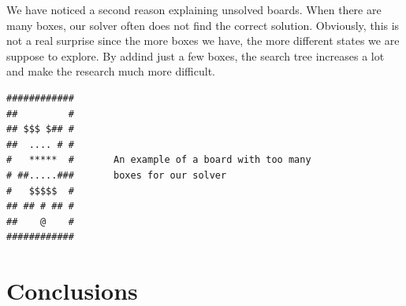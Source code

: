 \documentclass[a4paper,10pt]{article}
\begin{document}
We have noticed a second reason explaining unsolved boards. When there are many boxes, our solver often does not find the correct solution. Obviously, this is not a real surprise since the more boxes we have, the more different states we are suppose to explore. By addind just a few boxes, the search tree increases a lot and make the research much more difficult.

\begin{verbatim}
############
##         #
## $$$ $## #
##  .... # #
#   *****  #       An example of a board with too many
# ##.....###       boxes for our solver
#   $$$$$  #
## ## # ## #
##    @    #
############
\end{verbatim}


\section{Conclusions}
   
      
 
 
	
\end{document}
